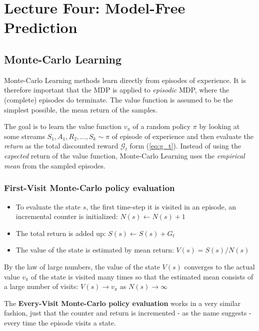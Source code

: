 \documentclass[10pt]{article}
\begin{document}
\section{Lecture Four: Model-Free Prediction}
\subsection{Monte-Carlo Learning}
Monte-Carlo Learning methods learn directly from episodes of experience. It is therefore important that the MDP is applied to \textit{episodic} MDP, where the (complete) episodes do terminate. The value function is assumed to be the simplest possible, the mean return of the samples.

The goal is to learn the value function $v_{\pi}$ of a random policy $\pi$ by looking at some streams $S_{1}, A_{1}, R_{2}, \ldots, S_{k} \sim \pi$ of episode of experience and then evaluate the \textit{return} as the total discounted reward $\mathcal{G}_{t}$ form (\ref{eq:g_t}). Instead of using the \textit{expected} return of the value function, Monte-Carlo Learning uses the \textit{empirical mean} from the sampled episodes.

\subsubsection*{First-Visit Monte-Carlo policy evaluation}
\begin{itemize}
\item To evaluate the state $s$, the first time-step it is visited in an episode, an incremental counter is initialized: 
$N(s) \leftarrow N(s) + 1$
\item The total return is added up: $S(s) \leftarrow S(s) + G_{t}$
\item The value of the state is estimated by mean return: $V(s) = S(s) / N(s)$
\end{itemize}
By the law of large numbers, the value of the state $V(s)$ converges to the actual value $v_{\pi}$ of the state is visited many times so that the estimated mean consists of a large number of visits: $V(s) \rightarrow v_{\pi}$ as $N(s) \rightarrow \infty$

The \textbf{Every-Visit Monte-Carlo policy evaluation} works in a very similar fashion, just that the counter and return is incremented - as the name suggests - every time the episode visits a state.
\end{document}
